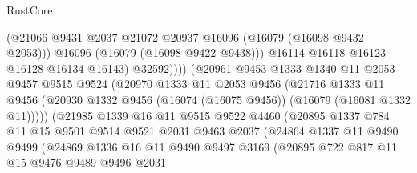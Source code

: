 \begin{lexlean}{RustCore}
\begin{coremodule}
                                (@21066
                                  @9431
                                  @2037
                                  @21072
                                  @20937
                                  @16096
                                  (@16079 (@16098 @9432 @2053)))
                                @16096
                                (@16079 (@16098 @9422 @9438)))
                              @16114
                              @16118
                              @16123
                              @16128
                              @16134
                              @16143)
                            @32592))))
                    (@20961
                      @9453
                      @1333
                      @1340
                      @11
                      @2053
                      @9457
                      @9515
                      @9524
                      (@20970
                        @1333
                        @11
                        @2053
                        @9456
                        (@21716
                          @1333
                          @11
                          @9456
                          (@20930 @1332 @9456 (@16074 (@16075 @9456)) (@16079 (@16081 @1332 @11)))))
                      (@21985
                        @1339
                        @16
                        @11
                        @9515
                        @9522
                        @4460
                        (@20895
                          @1337
                          @784
                          @11
                          @15
                          @9501
                          @9514
                          @9521
                          @2031
                          @9463
                          @2037
                          (@24864
                            @1337
                            @11
                            @9490
                            @9499
                            (@24869
                              @1336
                              @16
                              @11
                              @9490
                              @9497
                              @3169
                              (@20895
                                @722
                                @817
                                @11
                                @15
                                @9476
                                @9489
                                @9496
                                @2031

\end{coremodule}
\end{lexlean}

